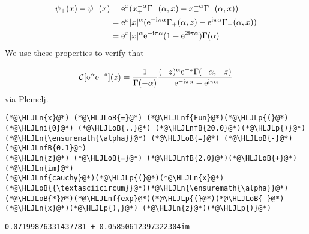 \documentclass[12pt,a4paper]{article}
\newcommand{\HLJLn}[1]{#1}
\newcommand{\HLJLnf}[1]{\textcolor[RGB]{66,102,213}{#1}}
\newcommand{\HLJLnfB}[1]{\textcolor[RGB]{59,151,46}{#1}}
\newcommand{\HLJLni}[1]{\textcolor[RGB]{59,151,46}{#1}}
\newcommand{\HLJLoB}[1]{\textcolor[RGB]{102,102,102}{\textbf{#1}}}
\newcommand{\HLJLp}[1]{#1}
\def\I{ {\rm i} }
\def\E{ {\rm e} }
\def\CC{ {\cal C} }
\def\addtab#1={#1\;&=}
\def\ccr{\\\addtab}
\def\addtab#1={#1\;&=}
\def\ccr{\\\addtab}
\begin{document}
\begin{align*}
\psi_+(x) - \psi_-(x) &= \E^x(x_+^{-\alpha} \Gamma_+(\alpha, x) -  x_-^{-\alpha}\Gamma_-(\alpha, x)) \ccr
= \E^x |x|^\alpha (\E^{-\I \pi \alpha} \Gamma_+(\alpha, z) - \E^{\I \pi \alpha} \Gamma_-(\alpha,x)) \ccr
 = \E^x |x|^\alpha \E^{-\I \pi \alpha} (1-\E^{2 \I \pi \alpha})\Gamma(\alpha)
\end{align*}
We use these properties to verify that

\[
\CC[\diamond^\alpha \E^{-\diamond}](z) = {1 \over \Gamma(-\alpha)} {(-z)^\alpha \E^{-z} \Gamma(-\alpha, - z) \over
  \E^{-\I\pi\alpha} - \E^{\I\pi\alpha}}
\]
via Plemelj.


\begin{lstlisting}
(*@\HLJLn{x}@*) (*@\HLJLoB{=}@*) (*@\HLJLnf{Fun}@*)(*@\HLJLp{(}@*)(*@\HLJLni{0}@*) (*@\HLJLoB{..}@*) (*@\HLJLnfB{20.0}@*)(*@\HLJLp{)}@*)
(*@\HLJLn{\ensuremath{\alpha}}@*) (*@\HLJLoB{=}@*) (*@\HLJLoB{-}@*)(*@\HLJLnfB{0.1}@*)
(*@\HLJLn{z}@*) (*@\HLJLoB{=}@*) (*@\HLJLnfB{2.0}@*)(*@\HLJLoB{+}@*)(*@\HLJLn{im}@*)
(*@\HLJLnf{cauchy}@*)(*@\HLJLp{(}@*)(*@\HLJLn{x}@*)(*@\HLJLoB{{\textasciicircum}}@*)(*@\HLJLn{\ensuremath{\alpha}}@*)(*@\HLJLoB{*}@*)(*@\HLJLnf{exp}@*)(*@\HLJLp{(}@*)(*@\HLJLoB{-}@*)(*@\HLJLn{x}@*)(*@\HLJLp{),}@*) (*@\HLJLn{z}@*)(*@\HLJLp{)}@*)
\end{lstlisting}

\begin{lstlisting}
0.07199876331437781 + 0.05850612397322304im
\end{lstlisting}
\end{document}
